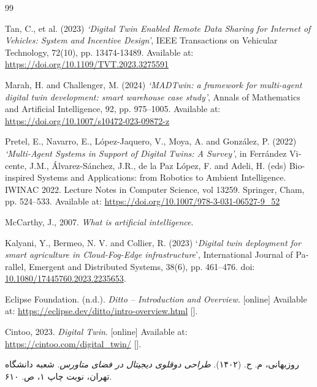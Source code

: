 \begin{thebibliography}{99}
\begin{latin}
Tan, C., et al. (2023) \textit{‘Digital Twin Enabled Remote Data Sharing for Internet of Vehicles: System and Incentive Design’}, IEEE Transactions on Vehicular Technology, 72(10), pp. 13474-13489. Available at: \url{https://doi.org/10.1109/TVT.2023.3275591}

Marah, H. and Challenger, M. (2024) \textit{‘MADTwin: a framework for multi-agent digital twin development: smart warehouse case study’}, Annals of Mathematics and Artificial Intelligence, 92, pp. 975–1005. Available at: \url{https://doi.org/10.1007/s10472-023-09872-z}

Pretel, E., Navarro, E., López-Jaquero, V., Moya, A. and González, P. (2022) \textit{‘Multi-Agent Systems in Support of Digital Twins: A Survey’}, in Ferrández Vicente, J.M., Álvarez-Sánchez, J.R., de la Paz López, F. and Adeli, H. (eds) Bio-inspired Systems and Applications: from Robotics to Ambient Intelligence. IWINAC 2022. Lecture Notes in Computer Science, vol 13259. Springer, Cham, pp.  524–533. Available at: \url{https://doi.org/10.1007/978-3-031-06527-9_52}

McCarthy, J., 2007. \textit{What is artificial intelligence}.

Kalyani, Y., Bermeo, N. V. and Collier, R. (2023) ‘\textit{Digital twin deployment for smart agriculture in Cloud-Fog-Edge infrastructure}’, International Journal of Parallel, Emergent and Distributed Systems, 38(6), pp. 461–476. doi: \url{10.1080/17445760.2023.2235653}.


Eclipse Foundation. (n.d.). \textit{Ditto – Introduction and Overview}. [online] Available at: \url{https://eclipse.dev/ditto/intro-overview.html} [].


Cintoo, 2023. \textit{Digital Twin}. [online] Available at: \url{https://cintoo.com/digital_twin/} [].

\end{latin}

روزبهانی، م. ح. (۱۴۰۲).
\textit{طراحی دوقلوی دیجیتال در فضای متاورس}. شعبه دانشگاه تهران، نوبت چاپ ۱، ص. ۶۱۰.


\end{thebibliography}